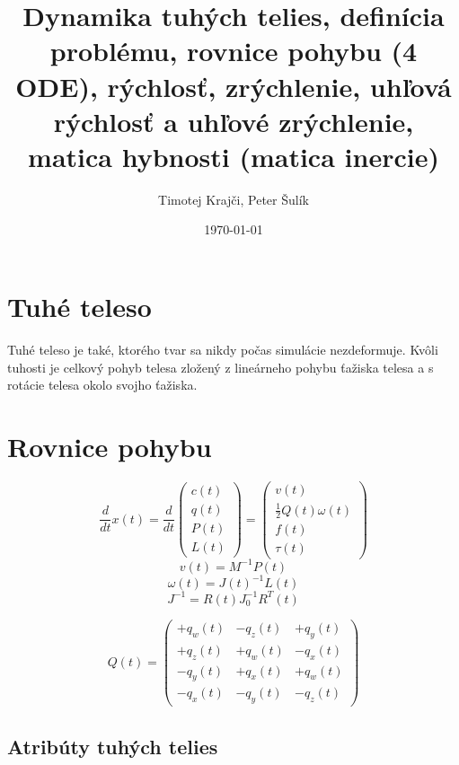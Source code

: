 \documentclass[paper=a4, fontsize=11pt]{scrartcl} %
\title{	
Dynamika tuhých telies, definícia problému, rovnice pohybu (4 ODE), rýchlosť, zrýchlenie, uhľová rýchlosť a uhľové zrýchlenie, matica hybnosti (matica inercie) \\ %
}
\author{Timotej Krajči, Peter Šulík} %
\date{\normalsize\today} %
\numberwithin{equation}{section} %
\numberwithin{figure}{section} %
\numberwithin{table}{section} %
\begin{document}
\maketitle %

\section{Tuhé teleso}

Tuhé teleso je také, ktorého tvar sa nikdy počas simulácie nezdeformuje. Kvôli tuhosti je
celkový pohyb telesa zložený z lineárneho pohybu ťažiska telesa a s rotácie telesa okolo
svojho ťažiska.

\section{Rovnice pohybu}
$$ \frac{d}{dt}x(t) =\frac{d}{dt}
\begin{pmatrix}
c(t)\\
q(t)\\
P(t)\\
L(t)
\end{pmatrix}
=
\begin{pmatrix}
v(t)\\
\frac{1}{2}Q(t)\omega(t)\\
f(t)\\
\tau(t)
\end{pmatrix}
$$
$$v(t) = M^{-1}P(t)$$
$$\omega(t) = J(t)^{-1}L(t)$$
$$ J^{-1} = R(t) J_{0}^{-1}R^{T}(t)$$

$$
Q(t) =
\begin{pmatrix}
+q_{w}(t) 	&	-q_{z}(t) 	&	+q_{y}(t)\\
+q_{z}(t) 	&	+q_{w}(t) 	&	-q_{x}(t)\\
-q_{y}(t) 	&	+q_{x}(t) 	&	+q_{w}(t)\\
-q_{x}(t) 	&	-q_{y}(t) 	&	-q_{z}(t)
\end{pmatrix}
$$

\subsection{Atribúty tuhých telies}
\end{document}

